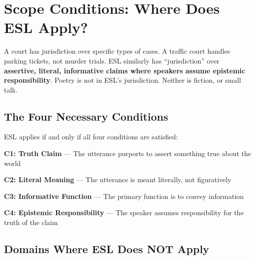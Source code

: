 

\section{Scope Conditions: Where Does ESL Apply?}
\label{sec:scope}

\begin{analogybox}
A court has jurisdiction over specific types of cases. A traffic court handles parking tickets, not murder trials. ESL similarly has ``jurisdiction'' over \textbf{assertive, literal, informative claims where speakers assume epistemic responsibility}. Poetry is not in ESL's jurisdiction. Neither is fiction, or small talk.
\end{analogybox}


\subsection{The Four Necessary Conditions}

ESL applies if and only if all four conditions are satisfied:

\begin{principlebox}
\textbf{C1: Truth Claim} --- The utterance purports to assert something true about the world

\textbf{C2: Literal Meaning} --- The utterance is meant literally, not figuratively

\textbf{C3: Informative Function} --- The primary function is to convey information

\textbf{C4: Epistemic Responsibility} --- The speaker assumes responsibility for the truth of the claim
\end{principlebox}


\subsection{Domains Where ESL Does NOT Apply}

